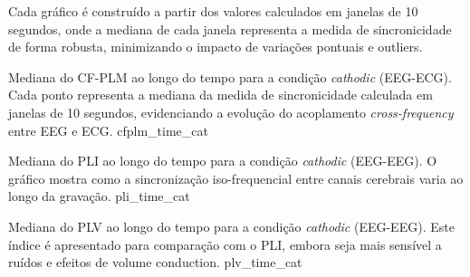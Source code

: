 
Cada gráfico é construído a partir dos valores calculados em janelas de 10 segundos, onde a mediana de cada janela representa a medida de sincronicidade de forma robusta, minimizando o impacto de variações pontuais e outliers.

{Mediana do CF-PLM ao longo do tempo para a condição \textit{cathodic} (EEG-ECG). Cada ponto representa a mediana da medida de sincronicidade calculada em janelas de 10 segundos, evidenciando a evolução do acoplamento \textit{cross-frequency} entre EEG e ECG.}
{cfplm_time_cat}

{Mediana do PLI ao longo do tempo para a condição \textit{cathodic} (EEG-EEG). O gráfico mostra como a sincronização iso-frequencial entre canais cerebrais varia ao longo da gravação.}
{pli_time_cat}

{Mediana do PLV ao longo do tempo para a condição \textit{cathodic} (EEG-EEG). Este índice é apresentado para comparação com o PLI, embora seja mais sensível a ruídos e efeitos de volume conduction.}
{plv_time_cat}
